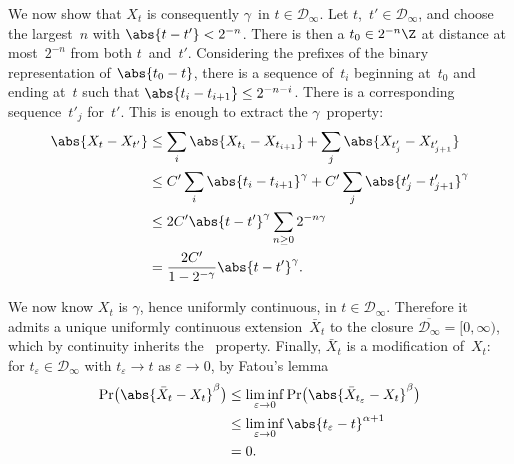 We now show that $X_t$ is consequently $\gamma$\dashHolder\
in \( t \in \mathcal D_\infty \).
Let $t$,~$t' \in \mathcal D_\infty$,
and choose the largest~$n$ with \( \abs{t-t'} < 2^{-n} \).
There is then a \( t_0 \in 2^{-n}\Z \)
at distance at most~$2^{-n}$ from both $t$~and~$t'$.
Considering the prefixes of the binary representation of \( \abs{t_0-t} \),
there is a sequence of~$t_i$ beginning at~$t_0$ and ending at~$t$
such that \( \abs{t_i - t_{i+1}} \le 2^{-n-i} \).
There is a corresponding sequence~$t'_j$ for~$t'$.
This is enough to extract the $\gamma$\dashHolder\ property:
\begin	{align*}
	\abs{X_t - X_{t'}}
	&\le	\sum_i \abs{X_{t_i} - X_{t_{i+1}}}
		+ \sum_j \abs{X_{t'_j} - X_{t'_{j+1}}} \\
	&\le	C'\sum_i \abs{t_i - t_{i+1}}^\gamma
		+ C'\sum_j \abs{t'_j - t'_{j+1}}^\gamma \\
	&\le	2C'\abs{t - t'}^\gamma \sum_{n \ge 0} 2^{-n\gamma} \\
	&=	\frac{2C'}{1-2^{-\gamma}} \abs{t - t'}^\gamma \text.
\end	{align*}

We now know $X_t$ is $\gamma$\dashHolder, hence uniformly continuous,
in \( t \in \mathcal D_\infty \).
Therefore it admits a unique uniformly continuous extension~$\bar X_t$
to the closure \( \overline{\mathcal D_\infty} = [0,\infty) \),
which by continuity inherits the \Holder\ property.
Finally, $\bar X_t$ is a modification of~$X_t$:
for \( t_\varepsilon \in \mathcal D_\infty \)
with \( t_\varepsilon \to t \) as \( \varepsilon \to 0 \),
by Fatou's lemma
\begin	{align*}
	\Pr\bigl( \abs{\bar X_t - X_t}^\beta \bigr)
	&\le	\liminf_{\varepsilon \to 0}
		\Pr\bigl( \abs{\bar X_{t_\varepsilon} - X_t}^\beta \bigr) \\
	&\le	\liminf_{\varepsilon \to 0}
		\abs{t_\varepsilon - t}^{\alpha+1} \\
	&=	0 \text.
\end	{align*}
